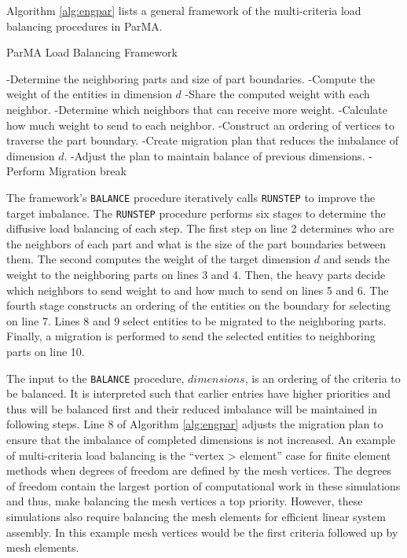 Algorithm \ref{alg:engpar} lists a general
framework of the multi-criteria load balancing procedures in ParMA.

\begin{algorithm}
\caption{ParMA Load Balancing Framework}
\label{alg:engpar}
\small
\begin{algorithmic}[1]
    \State -Determine the neighboring parts and size of part boundaries.
    \State -Compute the weight of the entities in dimension $d$
    \State -Share the computed weight with each neighbor.
    \State -Determine which neighbors that can receive more weight.
    \State -Calculate how much weight to send to each neighbor.
    \State -Construct an ordering of vertices to traverse the part boundary.
    \State -Create migration plan that reduces the imbalance of dimension $d$.
    \State -Adjust the plan to maintain balance of previous dimensions.
    \State -Perform Migration
  \EndProcedure
          \State break
        \EndIf
      \EndWhile
    \EndFor
  \EndProcedure
\end{algorithmic}
\end{algorithm}

The framework's \texttt{BALANCE} procedure iteratively
calls \texttt{RUNSTEP} to improve the
target imbalance. The \texttt{RUNSTEP} procedure performs six
stages to determine the diffusive load balancing of each
step. The first step on line 2 determines who are the
neighbors of each part and what is the size of the part
boundaries between them. The second computes the weight
of the target dimension $d$ and sends the weight to the
neighboring parts on lines 3 and 4. Then, the heavy
parts decide which neighbors to send weight to and how
much to send on lines 5 and 6. The fourth stage constructs
an ordering of the entities on the boundary for selecting
on line 7. Lines 8 and 9 select entities to be migrated
to the neighboring parts. Finally, a migration is performed
to send the selected entities to neighboring parts on line 10.

The input to the \texttt{BALANCE}
procedure, $dimensions$, is an ordering of the criteria
to be balanced. It is interpreted such that earlier
entries have higher priorities and thus will be balanced
first and their reduced imbalance will be maintained in following
steps. Line 8
of Algorithm \ref{alg:engpar} adjusts the migration plan to
ensure that the imbalance of completed dimensions is not
increased. An example of multi-criteria load balancing
is the ``vertex > element'' case for finite element
methods when degrees of freedom are defined by the mesh vertices.
The degrees of freedom contain the largest
portion of computational work in these simulations
and thus, make balancing the mesh vertices a top
priority. However, these simulations also require balancing
the mesh elements for efficient linear system assembly.
In this example mesh vertices would be the first criteria
followed up by mesh elements.

